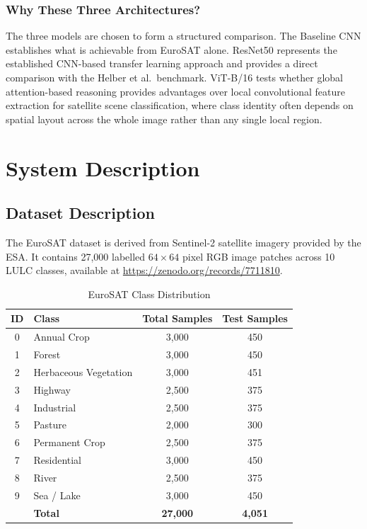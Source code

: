 \documentclass[12pt, letterpaper]{article}
\begin{document}
\subsubsection{Why These Three Architectures?}

The three models are chosen to form a structured comparison. The Baseline CNN
establishes what is achievable from EuroSAT alone. ResNet50 represents the established
CNN-based transfer learning approach and provides a direct comparison with the Helber
et al.\ benchmark. ViT-B/16 tests whether global attention-based reasoning provides
advantages over local convolutional feature extraction for satellite scene
classification, where class identity often depends on spatial layout across the whole
image rather than any single local region.

\section{System Description}

\subsection{Dataset Description}

The EuroSAT dataset \cite{helber2019eurosat} is derived from Sentinel-2 satellite
imagery provided by the ESA. It contains 27,000 labelled $64 \times 64$ pixel RGB
image patches across 10 LULC classes, available at
\url{https://zenodo.org/records/7711810}.

\begin{table}[h!]
    \centering
    \caption{EuroSAT Class Distribution}
    \label{tab:classes}
    \begin{tabular}{@{}clcc@{}}
        \toprule
        \textbf{ID} & \textbf{Class} &
        \textbf{Total Samples} & \textbf{Test Samples} \\
        \midrule
        0 & Annual Crop           & 3,000 & 450 \\
        1 & Forest                & 3,000 & 450 \\
        2 & Herbaceous Vegetation & 3,000 & 451 \\
        3 & Highway               & 2,500 & 375 \\
        4 & Industrial            & 2,500 & 375 \\
        5 & Pasture               & 2,000 & 300 \\
        6 & Permanent Crop        & 2,500 & 375 \\
        7 & Residential           & 3,000 & 450 \\
        8 & River                 & 2,500 & 375 \\
        9 & Sea / Lake            & 3,000 & 450 \\
        \midrule
          & \textbf{Total}        & \textbf{27,000} & \textbf{4,051} \\
        \bottomrule
    \end{tabular}
\end{table}
\end{document}

